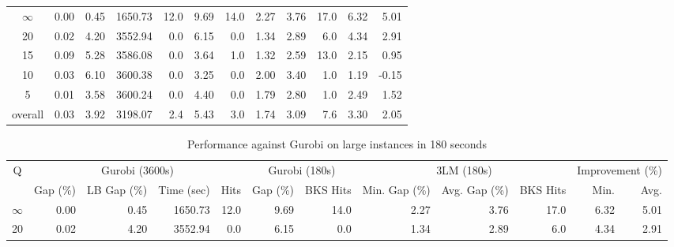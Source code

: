 \begin{table}[H]
\begin{tabular}{c rrrr rr rrr rr}
\cmidrule(lr){1-1} \cmidrule(lr){2-5} \cmidrule(lr){2-5} \cmidrule(lr){6-7} \cmidrule(lr){8-10} \cmidrule(lr){11-12}
$\infty$ &           0.00 &        0.45 &    1650.73 & 12.0 &          9.69 &     14.0 &          2.27 &          3.76 &     17.0 &             6.32 &  5.01 \\
      20 &           0.02 &        4.20 &    3552.94 &  0.0 &          6.15 &      0.0 &          1.34 &          2.89 &      6.0 &             4.34 &  2.91 \\
      15 &           0.09 &        5.28 &    3586.08 &  0.0 &          3.64 &      1.0 &          1.32 &          2.59 &     13.0 &             2.15 &  0.95 \\
      10 &           0.03 &        6.10 &    3600.38 &  0.0 &          3.25 &      0.0 &          2.00 &          3.40 &      1.0 &             1.19 & -0.15 \\
       5 &           0.01 &        3.58 &    3600.24 &  0.0 &          4.40 &      0.0 &          1.79 &          2.80 &      1.0 &             2.49 &  1.52 \\
\midrule
 overall &           0.03 &        3.92 &    3198.07 &  2.4 &          5.43 &      3.0 &          1.74 &          3.09 &      7.6 &             3.30 &  2.05 \\
\bottomrule
\end{tabular}
\end{table}\begin{table}[H]
\centering
\caption{Performance against Gurobi on large instances in 180 seconds}
\label{tab:3lm_resuts200T180}
\begin{tabular}{c rrrr rr rrr rr}
\toprule
       Q & \multicolumn{4}{c}{Gurobi (3600s)} & \multicolumn{2}{c}{Gurobi (180s)} & \multicolumn{3}{c}{3LM (180s)} & \multicolumn{2}{c}{Improvement (\%)} \\
         &       Gap (\%) & LB Gap (\%) & Time (sec) & Hits &      Gap (\%) & BKS Hits & Min. Gap (\%) & Avg. Gap (\%) & BKS Hits &             Min. &  Avg. \\
\cmidrule(lr){1-1} \cmidrule(lr){2-5} \cmidrule(lr){2-5} \cmidrule(lr){6-7} \cmidrule(lr){8-10} \cmidrule(lr){11-12}
$\infty$ &           0.00 &        0.45 &    1650.73 & 12.0 &          9.69 &     14.0 &          2.27 &          3.76 &     17.0 &             6.32 &  5.01 \\
      20 &           0.02 &        4.20 &    3552.94 &  0.0 &          6.15 &      0.0 &          1.34 &          2.89 &      6.0 &             4.34 &  2.91 \\

\end{tabular}
\end{table}

